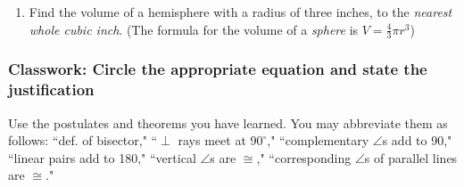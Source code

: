 \documentclass[12pt, twoside]{article}
\begin{document}
\begin{enumerate}
 \item Find the volume of a hemisphere with a radius of three inches, to the \emph{nearest whole cubic inch}. (The formula for the volume of a \emph{sphere} is $V=\frac{4}{3}\pi r^3$)

\end{enumerate}
\newpage
\subsubsection*{Classwork: Circle the appropriate equation and state the justification}
   Use the postulates and theorems you have learned. You may abbreviate them as follows: ``def. of bisector," ``$\perp$ rays meet at $90^\circ$," ``complementary $\angle$s add to 90," ``linear pairs add to 180," ``vertical $\angle$s are $\cong$," ``corresponding $\angle$s of parallel lines are $\cong$."
\end{document}
